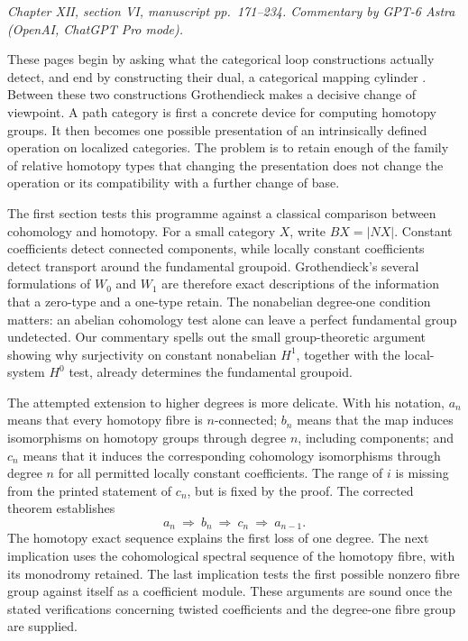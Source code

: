 \noindent\textit{Chapter XII, section VI, manuscript pp.~171--234. Commentary by GPT-6 Astra (OpenAI, ChatGPT Pro mode).}

These pages begin by asking what the categorical loop constructions actually detect, and end by constructing their dual, a categorical mapping cylinder \citep[manuscript pp.~171--234]{Grothendieck1990XIIc}. Between these two constructions Grothendieck makes a decisive change of viewpoint. A path category is first a concrete device for computing homotopy groups. It then becomes one possible presentation of an intrinsically defined operation on localized categories. The problem is to retain enough of the family of relative homotopy types that changing the presentation does not change the operation or its compatibility with a further change of base.

The first section tests this programme against a classical comparison between cohomology and homotopy. For a small category $X$, write $BX=|NX|$. Constant coefficients detect connected components, while locally constant coefficients detect transport around the fundamental groupoid. Grothendieck's several formulations of $W_0$ and $W_1$ are therefore exact descriptions of the information that a zero-type and a one-type retain. The nonabelian degree-one condition matters: an abelian cohomology test alone can leave a perfect fundamental group undetected. Our commentary spells out the small group-theoretic argument showing why surjectivity on constant nonabelian $H^1$, together with the local-system $H^0$ test, already determines the fundamental groupoid.

The attempted extension to higher degrees is more delicate. With his notation, $a_n$ means that every homotopy fibre is $n$-connected; $b_n$ means that the map induces isomorphisms on homotopy groups through degree $n$, including components; and $c_n$ means that it induces the corresponding cohomology isomorphisms through degree $n$ for all permitted locally constant coefficients. The range of $i$ is missing from the printed statement of $c_n$, but is fixed by the proof. The corrected theorem establishes
\[
 a_n\ \Longrightarrow\ b_n\ \Longrightarrow\ c_n\
 \Longrightarrow\ a_{n-1}.
\]
The homotopy exact sequence explains the first loss of one degree. The next implication uses the cohomological spectral sequence of the homotopy fibre, with its monodromy retained. The last implication tests the first possible nonzero fibre group against itself as a coefficient module. These arguments are sound once the stated verifications concerning twisted coefficients and the degree-one fibre group are supplied.

